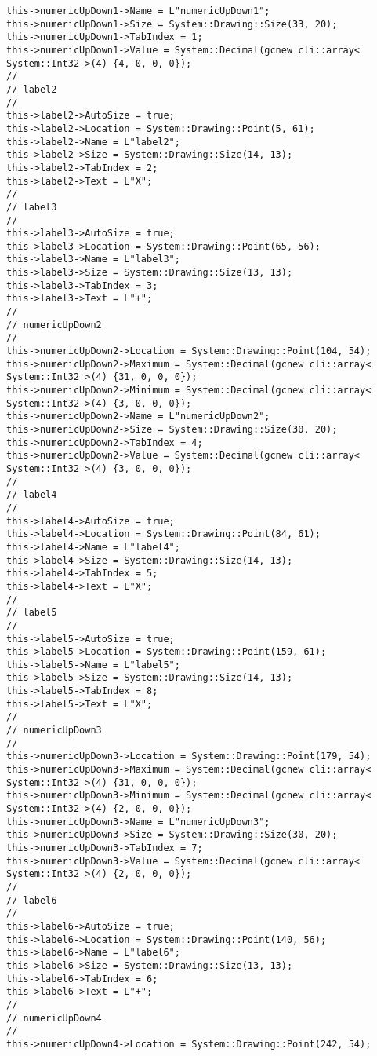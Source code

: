 \begin{lstlisting}[caption = {ОСНОВНАЯ ПОЛЕЗНАЯ ПРОГРАММА}, label = {4.cpp}]
this->numericUpDown1->Name = L"numericUpDown1";
this->numericUpDown1->Size = System::Drawing::Size(33, 20);
this->numericUpDown1->TabIndex = 1;
this->numericUpDown1->Value = System::Decimal(gcnew cli::array< System::Int32 >(4) {4, 0, 0, 0});
// 
// label2
// 
this->label2->AutoSize = true;
this->label2->Location = System::Drawing::Point(5, 61);
this->label2->Name = L"label2";
this->label2->Size = System::Drawing::Size(14, 13);
this->label2->TabIndex = 2;
this->label2->Text = L"Х";
// 
// label3
// 
this->label3->AutoSize = true;
this->label3->Location = System::Drawing::Point(65, 56);
this->label3->Name = L"label3";
this->label3->Size = System::Drawing::Size(13, 13);
this->label3->TabIndex = 3;
this->label3->Text = L"+";
// 
// numericUpDown2
// 
this->numericUpDown2->Location = System::Drawing::Point(104, 54);
this->numericUpDown2->Maximum = System::Decimal(gcnew cli::array< System::Int32 >(4) {31, 0, 0, 0});
this->numericUpDown2->Minimum = System::Decimal(gcnew cli::array< System::Int32 >(4) {3, 0, 0, 0});
this->numericUpDown2->Name = L"numericUpDown2";
this->numericUpDown2->Size = System::Drawing::Size(30, 20);
this->numericUpDown2->TabIndex = 4;
this->numericUpDown2->Value = System::Decimal(gcnew cli::array< System::Int32 >(4) {3, 0, 0, 0});
// 
// label4
// 
this->label4->AutoSize = true;
this->label4->Location = System::Drawing::Point(84, 61);
this->label4->Name = L"label4";
this->label4->Size = System::Drawing::Size(14, 13);
this->label4->TabIndex = 5;
this->label4->Text = L"Х";
// 
// label5
// 
this->label5->AutoSize = true;
this->label5->Location = System::Drawing::Point(159, 61);
this->label5->Name = L"label5";
this->label5->Size = System::Drawing::Size(14, 13);
this->label5->TabIndex = 8;
this->label5->Text = L"Х";
// 
// numericUpDown3
// 
this->numericUpDown3->Location = System::Drawing::Point(179, 54);
this->numericUpDown3->Maximum = System::Decimal(gcnew cli::array< System::Int32 >(4) {31, 0, 0, 0});
this->numericUpDown3->Minimum = System::Decimal(gcnew cli::array< System::Int32 >(4) {2, 0, 0, 0});
this->numericUpDown3->Name = L"numericUpDown3";
this->numericUpDown3->Size = System::Drawing::Size(30, 20);
this->numericUpDown3->TabIndex = 7;
this->numericUpDown3->Value = System::Decimal(gcnew cli::array< System::Int32 >(4) {2, 0, 0, 0});
// 
// label6
// 
this->label6->AutoSize = true;
this->label6->Location = System::Drawing::Point(140, 56);
this->label6->Name = L"label6";
this->label6->Size = System::Drawing::Size(13, 13);
this->label6->TabIndex = 6;
this->label6->Text = L"+";
// 
// numericUpDown4
// 
this->numericUpDown4->Location = System::Drawing::Point(242, 54);

\end{lstlisting}
